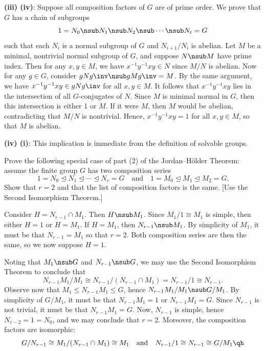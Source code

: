 \begin{sol}
    \textbf{(iii) \rightimp (iv)}: Suppose all composition factors of $G$ are of prime order. We prove that $G$ has a chain of subgroups
    \[1 = N_0 \nsub N_1 \nsub N_2 \nsub \cdots \nsub N_t = G\]
    such that each $N_i$ is a normal subgroup of $G$ and $N_{i + 1}/N_i$ is abelian. Let $M$ be a minimal, nontrivial normal subgroup of $G$, and suppose $N \nsub M$ have prime index. Then for any $x, y \in M$, we have $x^{-1}y^{-1}xy \in N$ since $M/N$ is abelian. Now for any $g \in G$, consider $gNg\inv \nsub gMg\inv = M$. By the same argument, we have $x^{-1}y^{-1}xy \in gNg\inv$ for all $x, y \in M$. It follows that $x^{-1}y^{-1}xy$ lies in the intersection of all $G$-conjugates of $N$. Since $M$ is minimal normal in $G$, then this intersection is either 1 or $M$. If it were $M$, then $M$ would be abelian, contradicting that $M/N$ is nontrivial. Hence, $x^{-1}y^{-1}xy = 1$ for all $x, y \in M$, so that $M$ is abelian.

    \textbf{(iv) \rightimp (i)}: This implication is immediate from the definition of solvable groups.
\end{sol}

\begin{exercise}\label{ex3.4.9}
    Prove the following special case of part (2) of the Jordan--H\"older Theorem: assume the finite group $G$ has two composition series
    \[ 1 = N_0 \trianglelefteq N_1 \trianglelefteq \cdots \trianglelefteq N_r = G \quad\text{and}\quad 1 = M_0 \trianglelefteq M_1 \trianglelefteq M_2 = G. \]
    Show that $r = 2$ and that the list of composition factors is the same. [Use the Second Isomorphism Theorem.]
\end{exercise}

\begin{sol}
    Consider $H = N_{r - 1} \cap M_1$. Then $H \nsub M_1$. Since $M_1/1 \cong M_1$ is simple, then either $H = 1$ or $H = M_1$. If $H = M_1$, then $N_{r - 1} \nsub M_1$. By simplicity of $M_1$, it must be that $N_{r - 1} = M_1$ so that $r = 2$. Both composition series are then the same, so we now suppose $H = 1$.

    Noting that $M_1 \nsub G$ and $N_{r - 1} \nsub G$, we may use the Second Isomorphism Theorem to conclude that
    \[N_{r - 1}M_1/M_1 \cong N_{r - 1}/(N_{r - 1} \cap M_1) = N_{r - 1}/1 \cong N_{r - 1}.\] Observe now that $M_1 \leq N_{r - 1}M_1 \leq G$, hence $N_{r - 1}M_1/M_1 \nsub G/M_1$. By simplicity of $G/M_1$, it must be that $N_{r - 1}M_1 = 1$ or $N_{r - 1}M_1 = G$. Since $N_{r - 1}$ is not trivial, it must be that $N_{r - 1}M_1 = G$. Now, $N_{r - 1}$ is simple, hence $N_{r - 2} = 1 = N_0$, and we may conclude that $r = 2$. Moreover, the composition factors are isomorphic:
    \[G/N_{r - 1} \cong M_1/(N_{r - 1} \cap M_1) \cong M_1 \quad \text{and} \quad N_{r - 1}/1 \cong N_{r - 1} \cong G/M_1 \qh\]
\end{sol}

